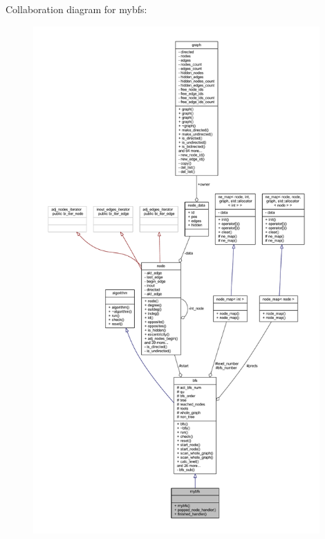 Collaboration diagram for mybfs\+:\nopagebreak
\begin{figure}[H]
\begin{center}
\leavevmode
\includegraphics[height=550pt]{classmybfs__coll__graph}
\end{center}
\end{figure}
